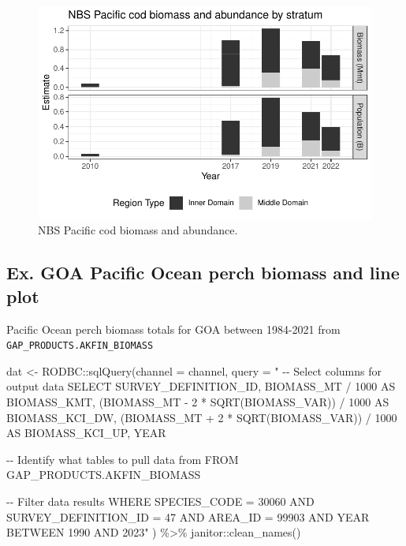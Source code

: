 \documentclass[
  letterpaper,
  oneside,
  open=any]{scrbook}
\newenvironment{Shaded}{\begin{snugshade}}{\end{snugshade}}
\newcommand{\AttributeTok}[1]{\textcolor[rgb]{0.40,0.45,0.13}{#1}}
\newcommand{\FunctionTok}[1]{\textcolor[rgb]{0.28,0.35,0.67}{#1}}
\newcommand{\NormalTok}[1]{\textcolor[rgb]{0.00,0.23,0.31}{#1}}
\newcommand{\OtherTok}[1]{\textcolor[rgb]{0.00,0.23,0.31}{#1}}
\newcommand{\SpecialCharTok}[1]{\textcolor[rgb]{0.37,0.37,0.37}{#1}}
\newcommand{\StringTok}[1]{\textcolor[rgb]{0.13,0.47,0.30}{#1}}
\begin{document}
\begin{figure}[H]

{\centering \includegraphics{content/akfin-oracle-sql-r_files/figure-pdf/test-4-fig-1.pdf}

}

\caption{NBS Pacific cod biomass and abundance.}

\end{figure}

\hypertarget{ex.-goa-pacific-ocean-perch-biomass-and-line-plot}{%
\subsection{Ex. GOA Pacific Ocean perch biomass and line
plot}\label{ex.-goa-pacific-ocean-perch-biomass-and-line-plot}}

Pacific Ocean perch biomass totals for GOA between 1984-2021 from
\texttt{GAP\_PRODUCTS.AKFIN\_BIOMASS}

\begin{Shaded}
\begin{Highlighting}[]
\NormalTok{dat }\OtherTok{\textless{}{-}}\NormalTok{ RODBC}\SpecialCharTok{::}\FunctionTok{sqlQuery}\NormalTok{(}\AttributeTok{channel =}\NormalTok{ channel,}
                       \AttributeTok{query =} \StringTok{"}
\StringTok{{-}{-} Select columns for output data}
\StringTok{SELECT}
\StringTok{SURVEY\_DEFINITION\_ID,}
\StringTok{BIOMASS\_MT / 1000 AS BIOMASS\_KMT,}
\StringTok{(BIOMASS\_MT {-} 2 * SQRT(BIOMASS\_VAR)) / 1000 AS BIOMASS\_KCI\_DW,}
\StringTok{(BIOMASS\_MT + 2 * SQRT(BIOMASS\_VAR)) / 1000 AS BIOMASS\_KCI\_UP,}
\StringTok{YEAR}

\StringTok{{-}{-} Identify what tables to pull data from}
\StringTok{FROM GAP\_PRODUCTS.AKFIN\_BIOMASS}

\StringTok{{-}{-} Filter data results}
\StringTok{WHERE SPECIES\_CODE = 30060}
\StringTok{AND SURVEY\_DEFINITION\_ID = 47}
\StringTok{AND AREA\_ID = 99903}
\StringTok{AND YEAR BETWEEN 1990 AND 2023"}\NormalTok{ ) }\SpecialCharTok{\%\textgreater{}\%} 
\NormalTok{  janitor}\SpecialCharTok{::}\FunctionTok{clean\_names}\NormalTok{()}
\end{Highlighting}
\end{Shaded}
\end{document}
